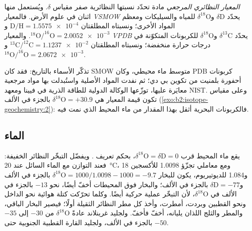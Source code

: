\begin{definition}\label{def:b2:isotope-geochemistry:standards}
\emph{المعيار النظائري المرجعي} مادة
تحدّد نسبتها النظائرية صفر مقياس $\delta$. ويُستعمل منها اثنان
في علوم الأرض. فالمعيار \emph{VSMOW}  يحدّد $\delta\mathrm{D}$ و$\delta^{18}\mathrm{O}$ للمياه والسيليكات
ومعظم المواد الأخرى؛ ونسبتاه المطلقتان $\mathrm{D}/\mathrm{H} =
\num{1.5575e-4}$ و$^{18}\mathrm{O}/^{16}\mathrm{O} = \num{2.0052e-3}$.
والمعيار \emph{VPDB}  يحدّد $\delta^{13}\mathrm{C}$
و$\delta^{18}\mathrm{O}$ للكربونات المتكوّنة في درجات حرارة منخفضة؛ ونسبتاه المطلقتان
$^{13}\mathrm{C}/^{12}\mathrm{C} = \num{1.1237e-2}$
و$^{18}\mathrm{O}/^{16}\mathrm{O} = \num{2.0672e-3}$.
\end{definition}

تذكّر الأسماء بالتاريخ: فقد كان SMOW متوسط ماء محيطي، وكان PDB
كربونات أحفورة بلمنيت من تكوين بي دي؛ ثم نفدت المواد
الأصلية واستُبدلت بها مواد مرجعية معايَرة عليها،
توزّعها الوكالة الدولية للطاقة الذرية في فيينا ومعهد NIST.
وعلى مقياس  تكون قيمة المعيار  هي $\delta^{18}\mathrm{O} = +30.9$ بالجزء في الألف
(\cref{exo:b2:isotope-geochemistry:2}): فالكربونات البحرية أثقل بهذا المقدار من ماء المحيط الذي نمت
فيه.

\subsection{الماء}

يقع ماء المحيط قرب $\delta^{18}\mathrm{O} = \delta\mathrm{D} = 0$، بحكم
تعريف . ويفضّل التبخّر النظائر الخفيفة: فعند التوازن
مع الماء السائل عند \qty{20}{\degreeCelsius}، ومع معاملي تجزّؤ
1.0098 للأكسجين 18 و1.084 للديوتيريوم، يكون للبخار
$\delta^{18}\mathrm{O} = 1000/1.0098 - 1000 = -9.7$ بالجزء في الألف و$\delta\mathrm{D} =
-77$ بالجزء في الألف؛ والبخار فوق المحيطات أخفّ أيضًا، نحو $-13$ بالجزء في الألف
في $\delta^{18}\mathrm{O}$، لأن التبخّر عملية حركية أيضًا.
وكلما تحرّكت كتلة هوائية نحو الداخل ونحو القطبين وبردت، أمطرت،
وأخذ كل مطر النظائر الثقيلة أولًا؛ فيصير البخار الباقي، والمطر
والثلج اللذان يليانه، أخفّ فأخفّ. ولجليد غرينلاند عادةً
$\delta^{18}\mathrm{O}$ من $-30$ إلى $-35$ بالجزء في الألف، ولجليد القارة القطبية الجنوبية حتى $-50$.

